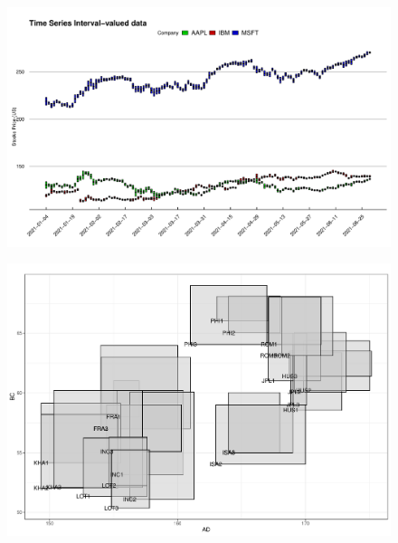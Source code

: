 \documentclass[article]{jss}
\begin{document}
\begin{appendix}
\begin{figure}[t!]
\centering
\includegraphics[width=1\textwidth]{pic/ts_3company} 
\caption{\label{fig:ts}}
\end{figure}



\begin{figure}[t!]
\centering
\includegraphics[width=1\textwidth]{pic/scatter} 
\caption{\label{fig:scatter}}
\end{figure}




\end{appendix}
\end{document}
